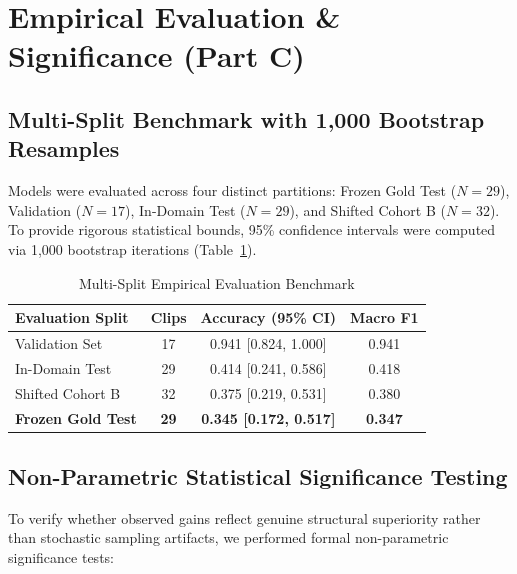 \documentclass[sigconf,authordraft]{acmart}
\begin{document}
\section{Empirical Evaluation & Significance (Part C)}
\label{sec:eval}

\subsection{Multi-Split Benchmark with 1,000 Bootstrap Resamples}

Models were evaluated across four distinct partitions: Frozen Gold Test ($N = 29$),
Validation ($N = 17$), In-Domain Test ($N = 29$), and Shifted Cohort B ($N = 32$).
To provide rigorous statistical bounds, 95\% confidence intervals were computed via 1,000 bootstrap
iterations (Table~\ref{tab:eval}).

\begin{table}[h]
  \caption{Multi-Split Empirical Evaluation Benchmark}
  \label{tab:eval}
  \centering
  \small
  \begin{tabular}{lccc}
    \toprule
    \textbf{Evaluation Split} & \textbf{Clips} & \textbf{Accuracy (95\% CI)} & \textbf{Macro F1} \\
    \midrule
    Validation Set & 17 & 0.941 [0.824, 1.000] & 0.941 \\
    In-Domain Test & 29 & 0.414 [0.241, 0.586] & 0.418 \\
    Shifted Cohort B & 32 & 0.375 [0.219, 0.531] & 0.380 \\
    \textbf{Frozen Gold Test} & \textbf{29} & \textbf{0.345 [0.172, 0.517]} & \textbf{0.347} \\
    \bottomrule
  \end{tabular}
\end{table}

\subsection{Non-Parametric Statistical Significance Testing}

To verify whether observed gains reflect genuine structural superiority rather than stochastic
sampling artifacts, we performed formal non-parametric significance tests:
\end{document}
